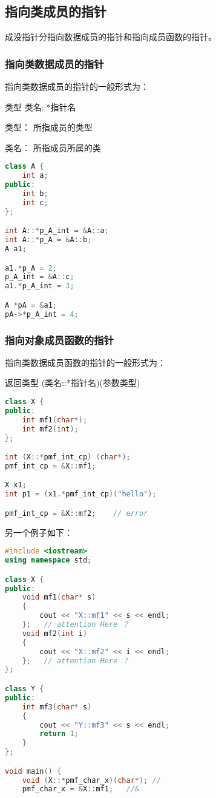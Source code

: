 \documentclass{article}
\begin{document}
\begin{CJK}{UTF8}{gbsn}
\subsection{指向类成员的指针}
成没指针分指向数据成员的指针和指向成员函数的指针。
\subsubsection{指向类数据成员的指针}
指向类数据成员的指针的一般形式为：

类型 类名::*指针名

类型： 所指成员的类型

类名： 所指成员所属的类 

\begin{lstlisting}[language=c++]
class A {
    int a;
public:
    int b;
    int c;
};

int A::*p_A_int = &A::a;
int A::*p_A = &A::b;
A a1;

a1.*p_A = 2;
p_A_int = &A::c;
a1.*p_A_int = 3;

A *pA = &a1;
pA->*p_A_int = 4;
\end{lstlisting}

\subsubsection{指向对象成员函数的指针}
指向类数据成员函数的指针的一般形式为：

返回类型 (类名::*指针名)(参数类型)
\begin{lstlisting}[language=c++]
class X {
public:
    int mf1(char*);
    int mf2(int);
};

int (X::*pmf_int_cp) (char*);
pmf_int_cp = &X::mf1;

X x1;
int p1 = (x1.*pmf_int_cp)("hello");

pmf_int_cp = &X::mf2;    // error
\end{lstlisting}
另一个例子如下：
\begin{lstlisting}[language=c++]
#include <iostream>
using namespace std;

class X {
public:
    void mf1(char* s) 
    {
        cout << "X::mf1" << s << endl;
    };   // attention Here ？
    void mf2(int i)     
    {
        cout << "X::mf2" << i << endl;
    };   // attention Here ？
};

class Y {
public:
    int mf3(char* s) 
    {
        cout << "Y::mf3" << s << endl;
        return 1;
    }
};

void main() {
    void (X::*pmf_char_x)(char*); //
    pmf_char_x = &X::mf1;   //&


\end{lstlisting}
\end{CJK}
\end{document}
